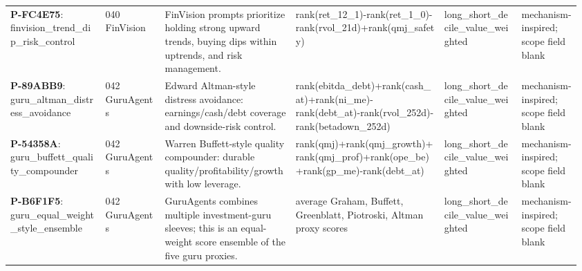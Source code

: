\begin{longtable}{@{}L{0.16\linewidth}L{0.10\linewidth}L{0.22\linewidth}L{0.25\linewidth}L{0.13\linewidth}L{0.10\linewidth}@{}}
\textbf{P-FC4E75}: finvision\_\allowbreak{}trend\_\allowbreak{}dip\_\allowbreak{}risk\_\allowbreak{}control & 040 FinVision & FinVision prompts prioritize holding strong upward trends, buying dips within uptrends, and risk management. & rank(\allowbreak{}ret\_\allowbreak{}12\_\allowbreak{}1)\allowbreak{}-\allowbreak{}rank(\allowbreak{}ret\_\allowbreak{}1\_\allowbreak{}0)\allowbreak{}-\allowbreak{}rank(\allowbreak{}rvol\_\allowbreak{}21d)\allowbreak{}+\allowbreak{}rank(\allowbreak{}qmj\_\allowbreak{}safety)\allowbreak{} & long\_\allowbreak{}short\_\allowbreak{}decile\_\allowbreak{}value\_\allowbreak{}weighted & mechanism-\allowbreak{}inspired;\allowbreak{} scope field blank \\
\textbf{P-89ABB9}: guru\_\allowbreak{}altman\_\allowbreak{}distress\_\allowbreak{}avoidance & 042 GuruAgents & Edward Altman-style distress avoidance: earnings/cash/debt coverage and downside-risk control. & rank(\allowbreak{}ebitda\_\allowbreak{}debt)\allowbreak{}+\allowbreak{}rank(\allowbreak{}cash\_\allowbreak{}at)\allowbreak{}+\allowbreak{}rank(\allowbreak{}ni\_\allowbreak{}me)\allowbreak{}-\allowbreak{}rank(\allowbreak{}debt\_\allowbreak{}at)\allowbreak{}-\allowbreak{}rank(\allowbreak{}rvol\_\allowbreak{}252d)\allowbreak{}-\allowbreak{}rank(\allowbreak{}betadown\_\allowbreak{}252d)\allowbreak{} & long\_\allowbreak{}short\_\allowbreak{}decile\_\allowbreak{}value\_\allowbreak{}weighted & mechanism-\allowbreak{}inspired;\allowbreak{} scope field blank \\
\textbf{P-54358A}: guru\_\allowbreak{}buffett\_\allowbreak{}quality\_\allowbreak{}compounder & 042 GuruAgents & Warren Buffett-style quality compounder: durable quality/profitability/growth with low leverage. & rank(\allowbreak{}qmj)\allowbreak{}+\allowbreak{}rank(\allowbreak{}qmj\_\allowbreak{}growth)\allowbreak{}+\allowbreak{}rank(\allowbreak{}qmj\_\allowbreak{}prof)\allowbreak{}+\allowbreak{}rank(\allowbreak{}ope\_\allowbreak{}be)\allowbreak{}+\allowbreak{}rank(\allowbreak{}gp\_\allowbreak{}me)\allowbreak{}-\allowbreak{}rank(\allowbreak{}debt\_\allowbreak{}at)\allowbreak{} & long\_\allowbreak{}short\_\allowbreak{}decile\_\allowbreak{}value\_\allowbreak{}weighted & mechanism-\allowbreak{}inspired;\allowbreak{} scope field blank \\
\textbf{P-B6F1F5}: guru\_\allowbreak{}equal\_\allowbreak{}weight\_\allowbreak{}style\_\allowbreak{}ensemble & 042 GuruAgents & GuruAgents combines multiple investment-guru sleeves; this is an equal-weight score ensemble of the five guru proxies. & average Graham,\allowbreak{} Buffett,\allowbreak{} Greenblatt,\allowbreak{} Piotroski,\allowbreak{} Altman proxy scores & long\_\allowbreak{}short\_\allowbreak{}decile\_\allowbreak{}value\_\allowbreak{}weighted & mechanism-\allowbreak{}inspired;\allowbreak{} scope field blank \\

\end{longtable}
